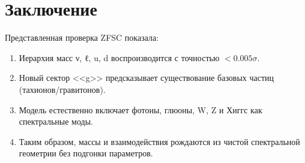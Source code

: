 \documentclass[12pt,a4paper]{article}
\begin{document}
\section{Заключение}
Представленная проверка ZFSC показала: 
\begin{enumerate}
\item Иерархия масс ν, ℓ, u, d воспроизводится с точностью $<0.005\sigma$. 
\item Новый сектор <<g>> предсказывает существование базовых частиц (тахионов/гравитонов). 
\item Модель естественно включает фотоны, глюоны, W, Z и Хиггс как спектральные моды. 
\item Таким образом, массы и взаимодействия рождаются из чистой спектральной геометрии без подгонки параметров. 
\end{enumerate}
\end{document}
